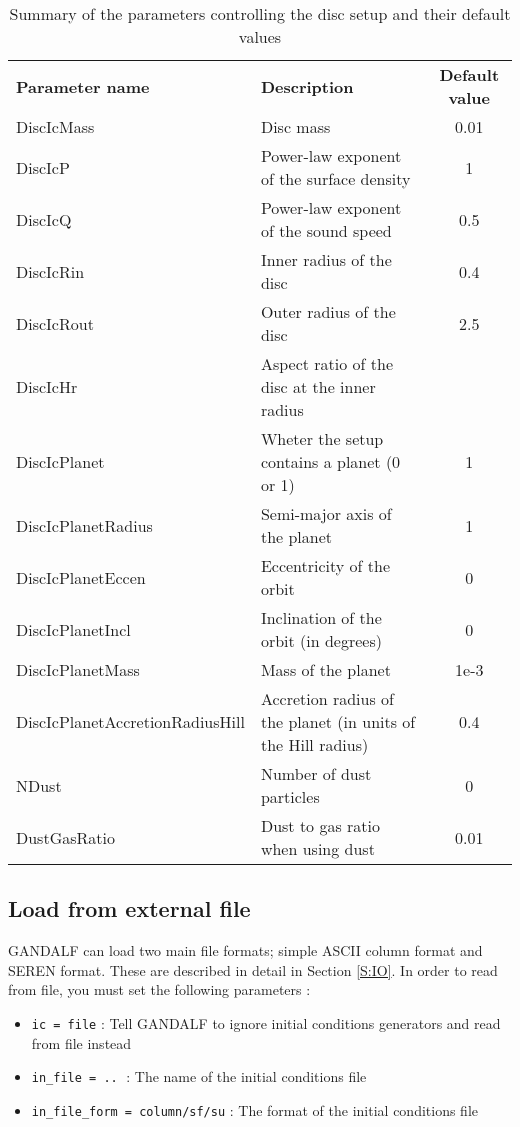 \documentclass[a4paper]{article}
\newcommand{\var}[1]{\texttt{#1}}
\begin{document}
\begin{table}


\begin{tabular}{llc}
\textbf{Parameter name} & \textbf{Description} & \textbf{Default value}\\
DiscIcMass & Disc mass & 0.01\\
DiscIcP & Power-law exponent of the surface density & 1\\
DiscIcQ & Power-law exponent of the sound speed & 0.5 \\
DiscIcRin & Inner radius of the disc & 0.4\\
DiscIcRout & Outer radius of the disc & 2.5\\
DiscIcHr & Aspect ratio of the disc at the inner radius\\
DiscIcPlanet & Wheter the setup contains a planet (0 or 1) & 1\\
DiscIcPlanetRadius & Semi-major axis of the planet & 1\\
DiscIcPlanetEccen & Eccentricity of the orbit & 0\\
DiscIcPlanetIncl & Inclination of the orbit (in degrees) & 0\\
DiscIcPlanetMass & Mass of the planet & 1e-3\\
DiscIcPlanetAccretionRadiusHill & Accretion radius of the planet (in units of the Hill radius) & 0.4\\
NDust & Number of dust particles & 0\\
DustGasRatio & Dust to gas ratio when using dust & 0.01
\end{tabular}
\caption{Summary of the parameters controlling the disc setup and their default values}
\label{table:disc}
\end{table}





\subsection{Load from external file}
GANDALF can load two main file formats; simple ASCII column format and SEREN format.  These are described in detail in Section \ref{S:IO}.  In order to read from file, you must set the following parameters :
\begin{itemize}
\item \var{ic = file} : Tell GANDALF to ignore initial conditions generators and read from file instead
\item \var{in\_file = ..}$\;$ : The name of the initial conditions file
\item \var{in\_file\_form = column/sf/su} : The format of the initial conditions file
\end{itemize}
\end{document}
